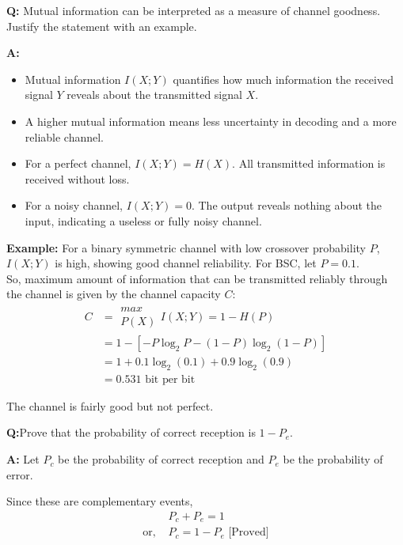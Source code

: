 \documentclass[11pt,a4paper]{book}
\newcounter{qna}[chapter]
\renewcommand{\theqna}{\thechapter.\arabic{qna}}
\newenvironment{questionanswerbox}[1][Example]{%
    \refstepcounter{qna}
    \begin{tcolorbox}[
        enhanced,
        breakable,
        colback=softlavender!10,
        colframe=softlavender!200,
        title={#1~\theqna},
        fonttitle=\bfseries,
        coltitle=white,
        colbacktitle=softlavender!200,
        sharp corners,
        boxrule=1pt,
        left=8pt,
        right=8pt,
        top=6pt,
        bottom=6pt
    ]
}{\end{tcolorbox}}
\begin{document}
\begin{questionanswerbox}[Channel Interpretation: Mutual Information as a Measure of Channel Goodness\\Example]
\textbf{Q:} Mutual information can be interpreted as a measure of channel goodness. Justify the statement with an example.

\textbf{A:}
\begin{itemize}
    \item Mutual information \(I(X;Y)\) quantifies how much information the received signal \(Y\) reveals about the transmitted signal \(X\).
    \item A higher mutual information means less uncertainty in decoding and a more reliable channel.
    \item For a perfect channel, \(I(X;Y)=H(X)\). All transmitted information is received without loss.
    \item For a noisy channel, \(I(X;Y)=0\). The output reveals nothing about the input, indicating a useless or fully noisy channel.
\end{itemize}

\textbf{Example:}
For a binary symmetric channel with low crossover probability \(P\), \(I(X;Y)\) is high, showing good channel reliability. For BSC, let \(P=0.1\).\\

So, maximum amount of information that can be transmitted reliably through the channel is given by the channel capacity \(C\):
\begin{align*}
    C &= \substack{max \\ P(X)} I(X;Y) = 1-H(P)\\
    &= 1-\left[-P\log_2 P-(1-P)\log_2(1-P)\right]\\
    &= 1+0.1\log_2(0.1)+0.9\log_2(0.9)\\
    &= 0.531 \text{ bit per bit}
\end{align*}

The channel is fairly good but not perfect.
\end{questionanswerbox}

\begin{questionanswerbox}[Probability of Correct Reception Example]
\textbf{Q:}Prove that the probability of correct reception is \(1-P_e\).

\textbf{A:}
Let \(P_c\) be the probability of correct reception and \(P_e\) be the probability of error.

Since these are complementary events,
\begin{align*}
    &P_c+P_e=1\\
    \text{or, } &P_c=1-P_e \text{  [Proved]}
\end{align*}
\end{questionanswerbox}
\end{document}
